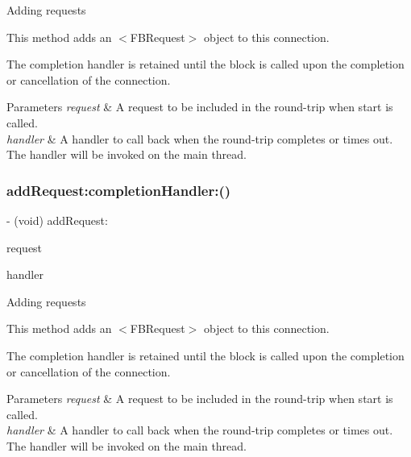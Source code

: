 Adding requests

This method adds an $<$\+F\+B\+Request$>$ object to this connection.

The completion handler is retained until the block is called upon the completion or cancellation of the connection.


\begin{DoxyParams}{Parameters}
{\em request} & A request to be included in the round-\/trip when start is called. \\
\hline
{\em handler} & A handler to call back when the round-\/trip completes or times out. The handler will be invoked on the main thread. \\
\hline
\end{DoxyParams}
\mbox{\label{interfaceFBRequestConnection_a751b0603d2cc22be745f33a112681e0d}} 
\subsubsection{\texorpdfstring{add\+Request\+:completion\+Handler\+:()}{addRequest:completionHandler:()}\hspace{0.1cm}{\footnotesize\ttfamily [5/5]}}
{\footnotesize\ttfamily -\/ (void) add\+Request\+: \begin{DoxyParamCaption}\item[{(\hyperlink{interfaceFBRequest}{F\+B\+Request} $\ast$)}]{request }\item[{completionHandler:(F\+B\+Request\+Handler)}]{handler }\end{DoxyParamCaption}}

Adding requests

This method adds an $<$\+F\+B\+Request$>$ object to this connection.

The completion handler is retained until the block is called upon the completion or cancellation of the connection.


\begin{DoxyParams}{Parameters}
{\em request} & A request to be included in the round-\/trip when start is called. \\
\hline
{\em handler} & A handler to call back when the round-\/trip completes or times out. The handler will be invoked on the main thread. \\
\hline
\end{DoxyParams}
\mbox{\label{interfaceFBRequestConnection_a9df3d0f146f9c8caada8ed8402dd7528}} 
